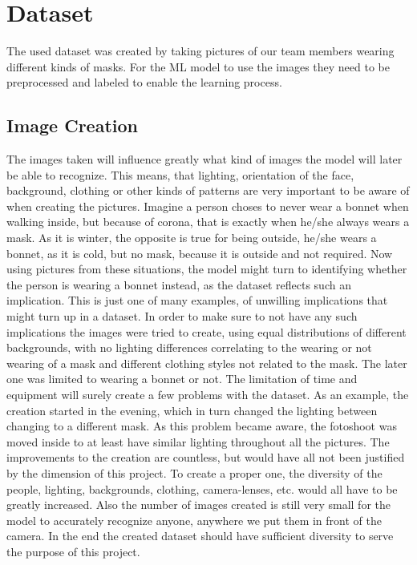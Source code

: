 \section{Dataset}

The used dataset was created by taking pictures of our team members wearing
different kinds of masks. For the ML model to use the images they need to be
preprocessed and labeled to enable the learning process.

\subsection{Image Creation}

The images taken will influence greatly what kind of images the model will later
be able to recognize. This means, that lighting, orientation of the face,
background, clothing or other kinds of patterns are very important to be aware
of when creating the pictures. 
\newline
Imagine a person choses to never wear a bonnet when walking inside, but because
of corona, that is exactly when he/she always wears a mask. As it is winter, the
opposite is true for being outside, he/she wears a bonnet, as it is cold, but no
mask, because it is outside and not required. Now using pictures from these
situations, the model might turn to identifying whether the person is wearing a
bonnet instead, as the dataset reflects such an implication. This is just one of
many examples, of unwilling implications that might turn up in a dataset.
\newline
In order to make sure to not have any such implications the images were tried to
create, using equal distributions of different backgrounds, with no lighting
differences correlating to the wearing or not wearing of a mask and different
clothing styles not related to the mask. The later one was limited to wearing a
bonnet or not.
\newline
The limitation of time and equipment will surely create a few problems with the
dataset. As an example, the creation started in the evening, which in turn
changed the lighting between changing to a different mask. As this problem
became aware, the fotoshoot was moved inside to at least have similar lighting
throughout all the pictures.
\newline
The improvements to the creation are countless, but would have all not been
justified by the dimension of this project. To create a proper one, the
diversity of the people, lighting, backgrounds, clothing, camera-lenses, etc.
would all have to be greatly increased. Also the number of images created is
still very small for the model to accurately recognize anyone, anywhere we put
them in front of the camera. In the end the created dataset should have
sufficient diversity to serve the purpose of this project.


